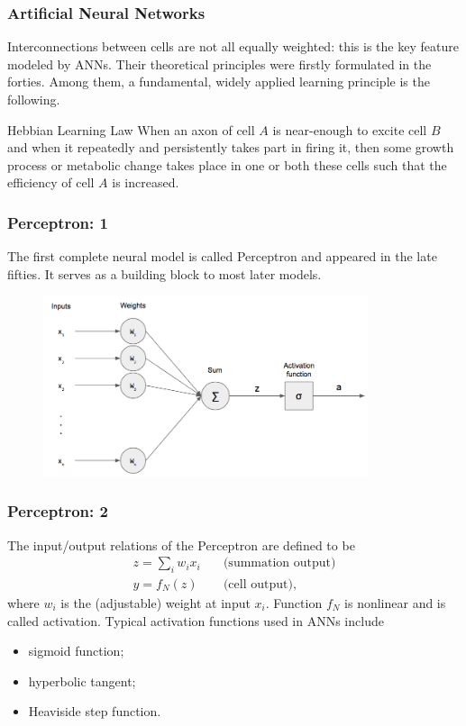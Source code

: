\documentclass{beamer}
\begin{document}

\begin{frame}
\frametitle{Artificial Neural Networks}
Interconnections between cells are not all equally weighted: this is the key feature modeled by ANNs. Their theoretical principles were firstly formulated in the forties. Among them, a fundamental, widely applied learning principle is the following.
\begin{block}{Hebbian Learning Law}
When an axon of cell $A$ is near-enough to excite cell $B$ and when it repeatedly and persistently takes part in firing it, then some growth process
or metabolic change takes place in one or both these cells such that the efficiency of cell $A$ is increased.
\end{block}
\end{frame}


\begin{frame}
\frametitle{Perceptron: 1}
The first complete neural model is called Perceptron and appeared in the late fifties. It serves as a building block to most later models.
\begin{figure}
\centering
\includegraphics[width = 0.85\textwidth]{"pictures/perceptron.png"}
\end{figure}
\end{frame}

\begin{frame}
\frametitle{Perceptron: 2}
The input/output relations of the Perceptron are defined to be
\begin{align*}
z = \sum_{i}w_i x_i \quad &\text{(summation output)} \\
y = f_N(z) \quad &\text{(cell output)}, 
\end{align*}
where $w_i$ is the (adjustable) weight at input $x_i$. Function $f_N$ is nonlinear and is called activation. Typical activation functions used in ANNs include
\begin{itemize}
\item sigmoid function;
\item hyperbolic tangent;
\item Heaviside step function.
\end{itemize}
\end{frame}
\end{document}

